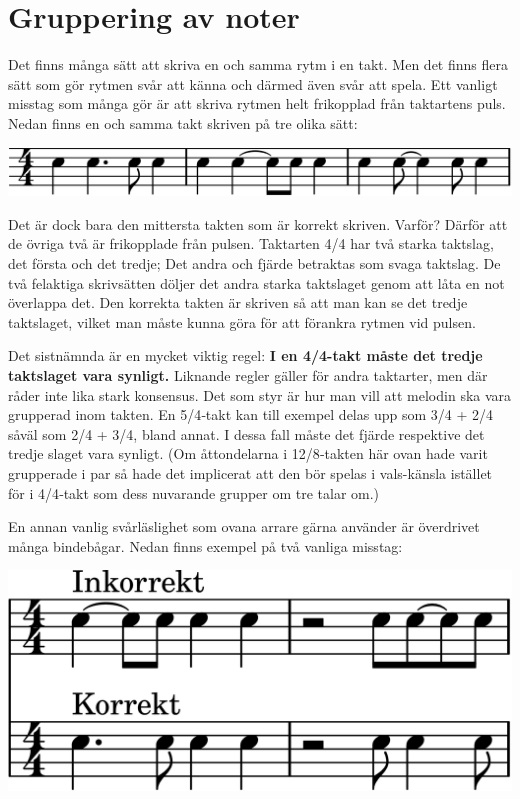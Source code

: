 \newpage
\section{Gruppering av noter}
Det finns många sätt att skriva en och samma rytm i en takt. Men det finns flera sätt som gör rytmen svår att känna och därmed även svår att spela. Ett vanligt misstag som många gör är att skriva rytmen helt frikopplad från taktartens puls. Nedan finns en och samma takt skriven på tre olika sätt:


\begin{center}
\includegraphics{lilypond/grouping.cropped.png}
\end{center}

Det är dock bara den mittersta takten som är korrekt skriven. Varför? Därför att de övriga två är frikopplade från pulsen. Taktarten 4/4 har två starka taktslag, det första och det tredje; Det andra och fjärde betraktas som svaga taktslag. De två felaktiga skrivsätten döljer det andra starka taktslaget genom att låta en not överlappa det. Den korrekta takten är skriven så att man kan se det tredje taktslaget, vilket man måste kunna göra för att förankra rytmen vid pulsen.

Det sistnämnda är en mycket viktig regel: \textbf{I en 4/4-takt måste det tredje taktslaget vara synligt.} Liknande regler gäller för andra taktarter, men där råder inte lika stark konsensus. Det som styr är hur man vill att melodin ska vara grupperad inom takten. En 5/4‐takt kan till exempel delas upp som 3/4 + 2/4 såväl som 2/4 + 3/4, bland annat. I dessa fall måste det fjärde respektive det tredje slaget vara synligt. (Om åttondelarna i 12/8‐takten här ovan hade varit grupperade i par så hade det implicerat att den bör spelas i vals-känsla istället för i 4/4‐takt som dess nuvarande grupper om tre talar om.)

En annan vanlig svårläslighet som ovana arrare gärna använder är överdrivet många bindebågar. Nedan finns exempel på två vanliga misstag:

\begin{center}
\includegraphics{lilypond/ties.cropped.png}
\end{center}

